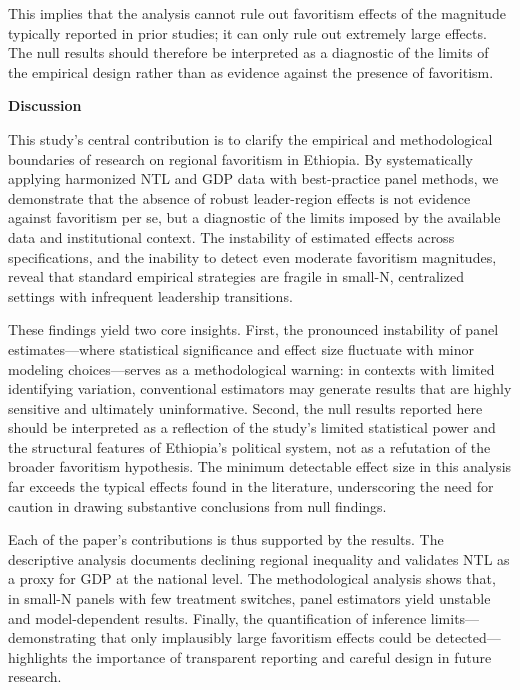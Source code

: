 \documentclass[12pt,a4paper]{article}
\begin{document}
This implies that the analysis cannot rule out favoritism effects of the magnitude typically reported in prior studies; it can only rule out extremely large effects. The null results should therefore be interpreted as a diagnostic of the limits of the empirical design rather than as evidence against the presence of favoritism.

\textbf{Discussion}

This study’s central contribution is to clarify the empirical and methodological boundaries of research on regional favoritism in Ethiopia. By systematically applying harmonized NTL and GDP data with best-practice panel methods, we demonstrate that the absence of robust leader-region effects is not evidence against favoritism per se, but a diagnostic of the limits imposed by the available data and institutional context. The instability of estimated effects across specifications, and the inability to detect even moderate favoritism magnitudes, reveal that standard empirical strategies are fragile in small-N, centralized settings with infrequent leadership transitions.

These findings yield two core insights. First, the pronounced instability of panel estimates—where statistical significance and effect size fluctuate with minor modeling choices—serves as a methodological warning: in contexts with limited identifying variation, conventional estimators may generate results that are highly sensitive and ultimately uninformative. Second, the null results reported here should be interpreted as a reflection of the study’s limited statistical power and the structural features of Ethiopia’s political system, not as a refutation of the broader favoritism hypothesis. The minimum detectable effect size in this analysis far exceeds the typical effects found in the literature, underscoring the need for caution in drawing substantive conclusions from null findings.

Each of the paper’s contributions is thus supported by the results. The descriptive analysis documents declining regional inequality and validates NTL as a proxy for GDP at the national level. The methodological analysis shows that, in small-N panels with few treatment switches, panel estimators yield unstable and model-dependent results. Finally, the quantification of inference limits—demonstrating that only implausibly large favoritism effects could be detected—highlights the importance of transparent reporting and careful design in future research.

\end{document}
